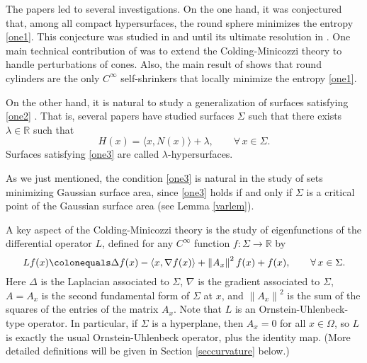 \documentclass[12pt,reqno]{amsart}
\theoremstyle{definition}
\renewcommand{\subset}{\subseteq}
\newcommand{\vnormt}[1]{\left\|#1\right\|}    %
\newcommand{\R}{\mathbb{R}}
\newcommand{\adimn}{n+1}
\newcommand{\scon}{\lambda}
\begin{document}
The papers \cite{colding12a,colding12} led to several investigations.  On the one hand, it was conjectured that, among all compact hypersurfaces, the round sphere minimizes the entropy \eqref{one1}.  This conjecture was studied in \cite{colding12} and \cite{bernstein16} until its ultimate resolution in \cite{zhu16}.  One main technical contribution of \cite{zhu16} was to extend the Colding-Minicozzi theory to handle perturbations of cones.  Also, the main result of \cite[Theorem 0.12]{colding12a} shows that round cylinders are the only $C^{\infty}$ self-shrinkers that locally minimize the entropy \eqref{one1}.

On the other hand, it is natural to study a generalization of surfaces satisfying \eqref{one2}
\cite{mcgonagle15,guang15,cheng14,cheng15,cheng16,barchiesi16}.  That is, several papers have studied surfaces $\Sigma$ such that there exists $\scon\in\R$ such that
\begin{equation}\label{one3}
H(x)=\langle x, N(x)\rangle+\scon,\qquad\forall\,x\in\Sigma.
\end{equation}
Surfaces satisfying \eqref{one3} are called $\lambda$-hypersurfaces.

As we just mentioned, the condition \eqref{one3} is natural in the study of sets minimizing Gaussian surface area, since \eqref{one3} holds if and only if $\Sigma$ is a critical point of the Gaussian surface area (see Lemma \ref{varlem}).

A key aspect of the Colding-Minicozzi theory is the study of eigenfunctions of the differential operator $L$, defined for any $C^{\infty}$ function $f\colon\Sigma\to\R$ by
\begin{equation}\label{one3.5}
Lf(x)\colonequals \Delta f(x)-\langle x,\nabla f(x)\rangle+\vnormt{A_{x}}^{2}f(x)+f(x),\qquad\forall\,x\in\Sigma.
\end{equation}
Here $\Delta$ is the Laplacian associated to $\Sigma$, $\nabla$ is the gradient associated to $\Sigma$, $A=A_{x}$ is the second fundamental form of $\Sigma$ at $x$, and $\vnormt{A_{x}}^{2}$ is the sum of the squares of the entries of the matrix $A_{x}$.  Note that $L$ is an Ornstein-Uhlenbeck-type operator.  In particular, if $\Sigma$ is a hyperplane, then $A_{x}=0$ for all $x\in\Omega$, so $L$ is exactly the usual Ornstein-Uhlenbeck operator, plus the identity map.  (More detailed definitions will be given in Section \ref{seccurvature} below.)
\end{document}

